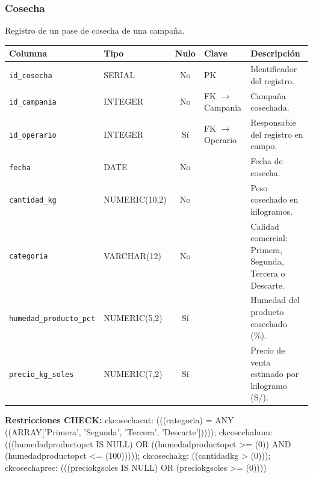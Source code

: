 \documentclass[11pt,letterpaper]{article}
\newcommand{\tbus}{\textunderscore\allowbreak}
\newcommand{\tb}[1]{{\ttfamily\let\_\tbus #1}}
\begin{document}
\subsubsection*{Cosecha}
Registro de un pase de cosecha de una campaña.
{\footnotesize
\begin{longtable}{>{\raggedright\arraybackslash}p{3.3cm}>{\raggedright\arraybackslash}p{2.5cm}c>{\raggedright\arraybackslash}p{2.2cm}>{\raggedright\arraybackslash}p{6.1cm}}
\toprule
\textbf{Columna} & \textbf{Tipo} & \textbf{Nulo} & \textbf{Clave} & \textbf{Descripción} \\
\midrule
\endhead
\texttt{id\_cosecha} & SERIAL & No & PK & Identificador del registro. \\
\texttt{id\_campania} & INTEGER & No & FK $\to$ Campania & Campaña cosechada. \\
\texttt{id\_operario} & INTEGER & Sí & FK $\to$ Operario & Responsable del registro en campo. \\
\texttt{fecha} & DATE & No &  & Fecha de cosecha. \\
\texttt{cantidad\_kg} & NUMERIC(10,2) & No &  & Peso cosechado en kilogramos. \\
\texttt{categoria} & VARCHAR(12) & No &  & Calidad comercial: Primera, Segunda, Tercera o Descarte. \\
\texttt{humedad\_producto\_pct} & NUMERIC(5,2) & Sí &  & Humedad del producto cosechado (\%). \\
\texttt{precio\_kg\_soles} & NUMERIC(7,2) & Sí &  & Precio de venta estimado por kilogramo (S/). \\
\bottomrule
\end{longtable}}
{\footnotesize\raggedright\textbf{Restricciones CHECK:} \tb{ck\_cosecha\_cat}: \tb{(((categoria) = ANY ((ARRAY['Primera', 'Segunda', 'Tercera', 'Descarte']))))}; \tb{ck\_cosecha\_hum}: \tb{(((humedad\_producto\_pct IS NULL) OR ((humedad\_producto\_pct >= (0)) AND (humedad\_producto\_pct <= (100)))))}; \tb{ck\_cosecha\_kg}: \tb{((cantidad\_kg > (0)))}; \tb{ck\_cosecha\_prec}: \tb{(((precio\_kg\_soles IS NULL) OR (precio\_kg\_soles >= (0))))}\par}
\medskip
\end{document}
